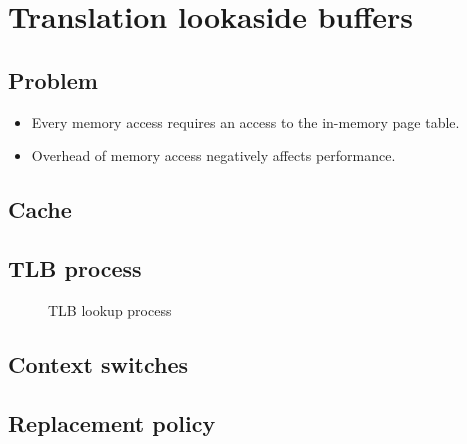 \chapter{Translation lookaside buffers}
\label{ch:tlb}



\section{Problem}

\begin{itemize}
\item Every memory access requires an access to the in-memory page table.
\item Overhead of memory access negatively affects performance.
\end{itemize}

\section{Cache}

\section{TLB process}

\begin{figure}[htbp]
  \centering
  \caption{TLB lookup process}
  \label{fig:tlb-lookup}
\end{figure}

\section{Context switches}

\section{Replacement policy}



